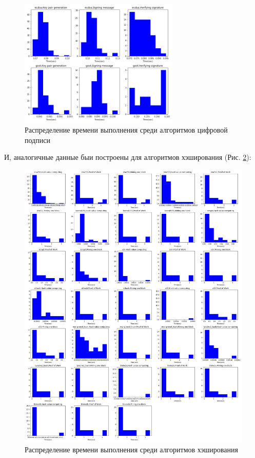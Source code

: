 \begin{figure}[h]
    \centering
    \includegraphics[width=0.68\textwidth]{./images/hists_dss}
    \caption{Распределение времени выполнения среди алгоритмов цифровой подписи}\label{dss}
\end{figure}

И, аналогичные данные быи построены для алгоритмов хэширования (Рис. \ref{hash}):

\begin{figure}
    \centering
    \includegraphics[width=\textwidth]{./images/hists_hashing}
    \caption{Распределение времени выполнения среди алгоритмов хэширования}\label{hash}
\end{figure}

